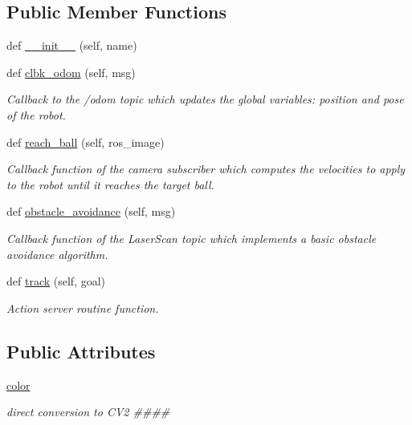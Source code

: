 \subsection*{Public Member Functions}
\begin{DoxyCompactItemize}
\item 
def \hyperlink{classtrack_1_1TrackAction_ad71d2ce7ecd91c384219ada7e8ed74e3}{\+\_\+\+\_\+init\+\_\+\+\_\+} (self, name)
\item 
def \hyperlink{classtrack_1_1TrackAction_a1f92640237725d8789986694c90bd98a}{clbk\+\_\+odom} (self, msg)
\begin{DoxyCompactList}\small\item\em Callback to the /odom topic which updates the global variables\+: position and pose of the robot. \end{DoxyCompactList}\item 
def \hyperlink{classtrack_1_1TrackAction_a3b41ed0eb7a403459469c27dd63a2392}{reach\+\_\+ball} (self, ros\+\_\+image)
\begin{DoxyCompactList}\small\item\em Callback function of the camera subscriber which computes the velocities to apply to the robot until it reaches the target ball. \end{DoxyCompactList}\item 
def \hyperlink{classtrack_1_1TrackAction_ab20439d63451e7799ecf2a2ec1f8c860}{obstacle\+\_\+avoidance} (self, msg)
\begin{DoxyCompactList}\small\item\em Callback function of the Laser\+Scan topic which implements a basic obstacle avoidance algorithm. \end{DoxyCompactList}\item 
def \hyperlink{classtrack_1_1TrackAction_a1d41a25e35227ab25323a95eeb9a4bb2}{track} (self, goal)
\begin{DoxyCompactList}\small\item\em Action server routine function. \end{DoxyCompactList}\end{DoxyCompactItemize}
\subsection*{Public Attributes}
\begin{DoxyCompactItemize}
\item 
\hyperlink{classtrack_1_1TrackAction_abba894c7d22403050003dc50f5d79bba}{color}
\begin{DoxyCompactList}\small\item\em direct conversion to C\+V2 \#\#\#\# \end{DoxyCompactList}\end{DoxyCompactItemize}
